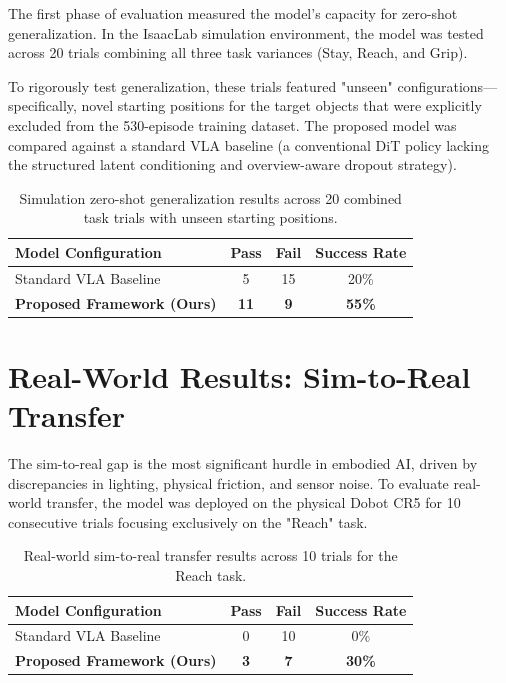 The first phase of evaluation measured the model's capacity for zero-shot generalization. In the IsaacLab simulation environment, the model was tested across 20 trials combining all three task variances (Stay, Reach, and Grip). 

To rigorously test generalization, these trials featured "unseen" configurations---specifically, novel starting positions for the target objects that were explicitly excluded from the 530-episode training dataset. The proposed model was compared against a standard VLA baseline (a conventional DiT policy lacking the structured latent conditioning and overview-aware dropout strategy).

\begin{table}[H]
    \centering
    \begin{tabular}{lccc}
        \toprule
        \textbf{Model Configuration} & \textbf{Pass} & \textbf{Fail} & \textbf{Success Rate} \\
        \midrule
        Standard VLA Baseline & 5 & 15 & 20\% \\
        \textbf{Proposed Framework (Ours)} & \textbf{11} & \textbf{9} & \textbf{55\%} \\
        \bottomrule
    \end{tabular}
    \caption[Simulation Generalization Results]{Simulation zero-shot generalization results across 20 combined task trials with unseen starting positions.}
    \label{tab:sim_results}
\end{table}

\section{Real-World Results: Sim-to-Real Transfer}
\label{sec:real_results}

The sim-to-real gap is the most significant hurdle in embodied AI, driven by discrepancies in lighting, physical friction, and sensor noise. To evaluate real-world transfer, the model was deployed on the physical Dobot CR5 for 10 consecutive trials focusing exclusively on the "Reach" task.

\begin{table}[H]
    \centering
    \begin{tabular}{lccc}
        \toprule
        \textbf{Model Configuration} & \textbf{Pass} & \textbf{Fail} & \textbf{Success Rate} \\
        \midrule
        Standard VLA Baseline & 0 & 10 & 0\% \\
        \textbf{Proposed Framework (Ours)} & \textbf{3} & \textbf{7} & \textbf{30\%} \\
        \bottomrule
    \end{tabular}
    \caption[Real-World Reach Task Results]{Real-world sim-to-real transfer results across 10 trials for the Reach task.}
    \label{tab:real_results}
\end{table}

